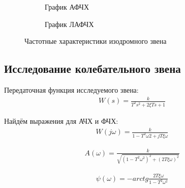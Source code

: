 \documentclass[a4paper, 11pt]{article}
\begin{document}
\begin{figure}[h!]
    \begin{subfigure}{0.5\textwidth}
        \centering
        \caption{График АФЧХ}
    \end{subfigure}
    \begin{subfigure}{0.5\textwidth}
        \centering
        \caption{График ЛАФЧХ}
    \end{subfigure}
    \caption{Частотные характеристики изодромного звена}
\end{figure}

\newpage
\begin{center}
	\section{Исследование колебательного звена}
\end{center}

\par 
Передаточная функция исследуемого звена:
\begin{align}
	W(s)=\frac{k}{T^2s^2 + 2{\xi}Ts + 1}
\end{align}
\par 
Найдём выражения для АЧХ и ФЧХ:
\begin{align}
	W(j\omega)=\frac{k}{1-T^2\omega2+jT\xi\omega}
\end{align}

\begin{align}
	A(\omega)=\frac{k}{\sqrt{(1-T^2\omega^2)^2+(2T\xi\omega)^2}}
\end{align}

\begin{align}
	\psi(\omega)=-arctg\frac{2T\xi\omega}{1-T^2\omega^2}
\end{align}
\end{document}
